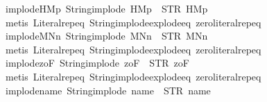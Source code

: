 \begin{isabellebody}
\endisatagproof
{\isafoldproof}%
%
\isadelimproof
\isanewline
%
\endisadelimproof
\isanewline
{}\isamarkupfalse%
\ implode{\isacharunderscore}HM{}p{\isacharcolon}\ {\isachardoublequoteopen}String{\isachardot}implode\ {\isacharprime}{\isacharprime}HM{}p{\isacharprime}{\isacharprime}\ {\isacharequal}\ STR\ {\isacharprime}{\isacharprime}HM{}p{\isacharprime}{\isacharprime}{\isachardoublequoteclose}\isanewline
%
\isadelimproof
\ \ %
\endisadelimproof
%
\isatagproof
{}\isamarkupfalse%
\ {\isacharparenleft}metis\ Literal{\isachardot}rep{\isacharunderscore}eq\ String{\isachardot}implode{\isacharunderscore}explode{\isacharunderscore}eq\ zero{\isacharunderscore}literal{\isachardot}rep{\isacharunderscore}eq{\isacharparenright}%
\endisatagproof
{\isafoldproof}%
%
\isadelimproof
\isanewline
%
\endisadelimproof
\isanewline
{}\isamarkupfalse%
\ implode{\isacharunderscore}MNn{}{\isacharcolon}\ {\isachardoublequoteopen}String{\isachardot}implode\ {\isacharprime}{\isacharprime}MNn{}{\isacharprime}{\isacharprime}\ {\isacharequal}\ STR\ {\isacharprime}{\isacharprime}MNn{}{\isacharprime}{\isacharprime}{\isachardoublequoteclose}\isanewline
%
\isadelimproof
\ \ %
\endisadelimproof
%
\isatagproof
{}\isamarkupfalse%
\ {\isacharparenleft}metis\ Literal{\isachardot}rep{\isacharunderscore}eq\ String{\isachardot}implode{\isacharunderscore}explode{\isacharunderscore}eq\ zero{\isacharunderscore}literal{\isachardot}rep{\isacharunderscore}eq{\isacharparenright}%
\endisatagproof
{\isafoldproof}%
%
\isadelimproof
\isanewline
%
\endisadelimproof
\isanewline
{}\isamarkupfalse%
\ implode{\isacharunderscore}{}zoF{\isacharcolon}\ {\isachardoublequoteopen}String{\isachardot}implode\ {\isacharprime}{\isacharprime}{}zoF{\isacharprime}{\isacharprime}\ {\isacharequal}\ STR\ {\isacharprime}{\isacharprime}{}zoF{\isacharprime}{\isacharprime}{\isachardoublequoteclose}\isanewline
%
\isadelimproof
\ \ %
\endisadelimproof
%
\isatagproof
{}\isamarkupfalse%
\ {\isacharparenleft}metis\ Literal{\isachardot}rep{\isacharunderscore}eq\ String{\isachardot}implode{\isacharunderscore}explode{\isacharunderscore}eq\ zero{\isacharunderscore}literal{\isachardot}rep{\isacharunderscore}eq{\isacharparenright}%
\endisatagproof
{\isafoldproof}%
%
\isadelimproof
\isanewline
%
\endisadelimproof
\isanewline
{}\isamarkupfalse%
\ implode{\isacharunderscore}name{\isacharcolon}\ {\isachardoublequoteopen}String{\isachardot}implode\ {\isacharprime}{\isacharprime}name{\isacharprime}{\isacharprime}\ {\isacharequal}\ STR\ {\isacharprime}{\isacharprime}name{\isacharprime}{\isacharprime}{\isachardoublequoteclose}\isanewline

\end{isabellebody}
